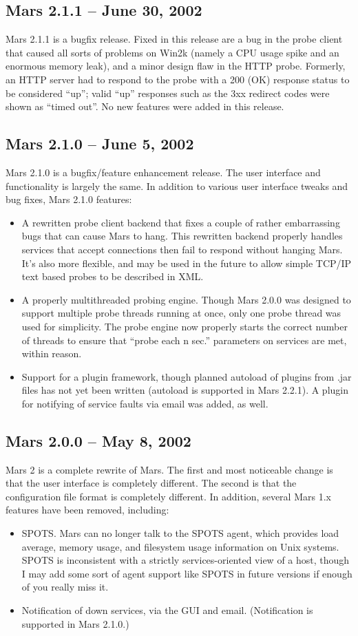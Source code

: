\documentclass{article}
\begin{document}
\subsection{Mars 2.1.1 -- June 30, 2002}
Mars 2.1.1 is a bugfix release. Fixed in this release are a bug in the probe
client that caused all sorts of problems on Win2k (namely a CPU usage spike and
an enormous memory leak), and a minor design flaw in the HTTP probe. Formerly,
an HTTP server had to respond to the probe with a 200 (OK) response status to
be considered ``up''; valid ``up'' responses such as the 3xx redirect codes were
shown as ``timed out''. No new features were added in this release.

\subsection{Mars 2.1.0 -- June 5, 2002}
Mars 2.1.0 is a bugfix/feature enhancement release.  The user interface and
functionality is largely the same. In addition to various user interface tweaks
and bug fixes, Mars 2.1.0 features:
\begin{itemize}
\item A rewritten probe client backend that fixes a couple of rather
embarrassing bugs that can cause Mars to hang.  This rewritten backend properly
handles services that accept connections then fail to respond without hanging
Mars. It's also more flexible, and may be used in the future to allow simple
TCP/IP text based probes to be described in XML.
\item A properly multithreaded probing engine. Though Mars 2.0.0 was designed
to support multiple probe threads running at once, only one probe thread was
used for simplicity. The probe engine now properly starts the correct number of
threads to ensure that ``probe each n sec.'' parameters on services are met,
within reason.
\item Support for a plugin framework, though planned autoload of plugins from
.jar files has not yet been written (autoload is supported in Mars 2.2.1). A
plugin for notifying of service faults via email was added, as well.  
\end{itemize}

\subsection{Mars 2.0.0 -- May 8, 2002}
Mars 2 is a complete rewrite of Mars. The first and most noticeable change is
that the user interface is completely different. The second is that the
configuration file format is completely different.  In addition, several Mars
1.x features have been removed, including:
\begin{itemize}
\item SPOTS. Mars can no longer talk to the SPOTS agent, which provides load
average, memory usage, and filesystem usage information on Unix systems. SPOTS
is inconsistent with a strictly services-oriented view of a host, though I may
add some sort of agent support like SPOTS in future versions if enough of you
really miss it.
\item Notification of down services, via the GUI and email. (Notification is
supported in Mars 2.1.0.)
\end{itemize}
\end{document}
